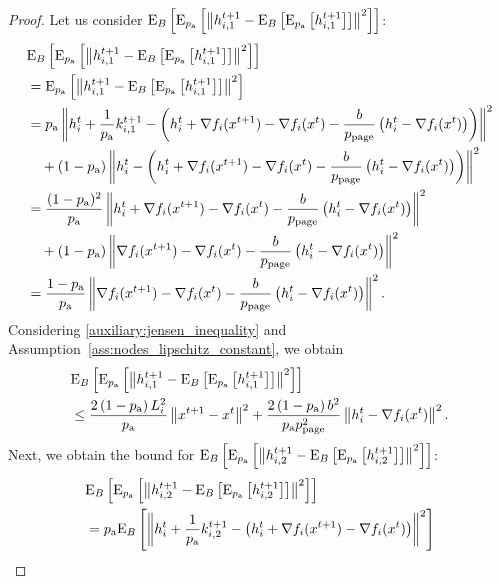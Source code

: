 \documentclass{article}
\newcommand*{\probavailable}{\ensuremath{p_{\textnormal{a}}}}
\newcommand*{\probpage}{\ensuremath{p_{\text{page}}}}
\begin{document}
\begin{proof}
  Let us consider $\ExpSub{B}{\ExpSub{\probavailable}{\norm{h^{t+1}_{i,1} - \ExpSub{B}{\ExpSub{\probavailable}{h^{t+1}_{i,1}}}}^2}}$:
  \begin{align*}
    &\ExpSub{B}{\ExpSub{\probavailable}{\norm{h^{t+1}_{i,1} - \ExpSub{B}{\ExpSub{\probavailable}{h^{t+1}_{i,1}}}}^2}}\\
    &=\ExpSub{\probavailable}{\norm{h^{t+1}_{i,1} - \ExpSub{B}{\ExpSub{\probavailable}{h^{t+1}_{i,1}}}}^2} \\
    &=\probavailable \norm{h^t_i + \frac{1}{\probavailable} k^{t+1}_{i, 1} - \left(h^t_i + \nabla f_i(x^{t+1}) - \nabla f_i(x^{t}) - \frac{b}{\probpage} \left(h^t_i - \nabla f_i(x^{t})\right)\right)}^2 \\
    &\quad + (1 - \probavailable) \norm{h^t_i - \left(h^t_i + \nabla f_i(x^{t+1}) - \nabla f_i(x^{t}) - \frac{b}{\probpage} \left(h^t_i - \nabla f_i(x^{t})\right)\right)}^2 \\
    &=\frac{(1 - \probavailable)^2}{\probavailable} \norm{h^t_i + \nabla f_i(x^{t+1}) - \nabla f_i(x^{t}) - \frac{b}{\probpage} \left(h^t_i - \nabla f_i(x^{t})\right)}^2 \\
    &\quad + (1 - \probavailable) \norm{\nabla f_i(x^{t+1}) - \nabla f_i(x^{t}) - \frac{b}{\probpage} \left(h^t_i - \nabla f_i(x^{t})\right)}^2 \\
    &=\frac{1 - \probavailable}{\probavailable} \norm{\nabla f_i(x^{t+1}) - \nabla f_i(x^{t}) - \frac{b}{\probpage} \left(h^t_i - \nabla f_i(x^{t})\right)}^2.
  \end{align*}
  Considering \eqref{auxiliary:jensen_inequality} and Assumption~\ref{ass:nodes_lipschitz_constant}, we obtain
  \begin{align}
    &\ExpSub{B}{\ExpSub{\probavailable}{\norm{h^{t+1}_{i,1} - \ExpSub{B}{\ExpSub{\probavailable}{h^{t+1}_{i,1}}}}^2}} \nonumber\\
    &\leq \frac{2\left(1 - \probavailable\right)L_i^2}{\probavailable} \norm{x^{t+1} - x^{t}}^2 + \frac{2\left(1 - \probavailable\right)b^2}{\probavailable \probpage^2} \norm{h^t_i - \nabla f_i(x^{t})}^2 \label{eq:page_proof:mini:h_1}.
  \end{align}
  Next, we obtain the bound for $\ExpSub{B}{\ExpSub{\probavailable}{\norm{h^{t+1}_{i,2} - \ExpSub{B}{\ExpSub{\probavailable}{h^{t+1}_{i,2}}}}^2}}$:
  \begin{align}
    &\ExpSub{B}{\ExpSub{\probavailable}{\norm{h^{t+1}_{i,2} - \ExpSub{B}{\ExpSub{\probavailable}{h^{t+1}_{i,2}}}}^2}} \nonumber \\
    &= \probavailable \ExpSub{B}{\norm{h^t_i + \frac{1}{\probavailable} k^{t+1}_{i, 2} - \left(h^t_i + \nabla f_i(x^{t+1}) - \nabla f_i(x^{t})\right)}^2} \nonumber\\

\end{align}
\end{proof}
\end{document}
